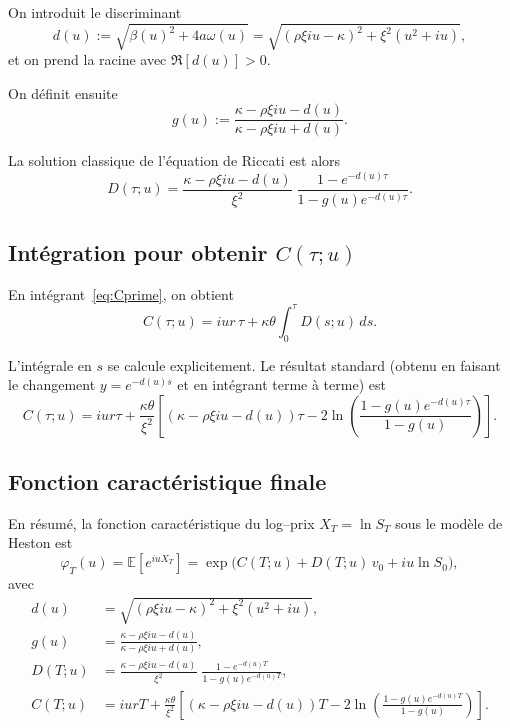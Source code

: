 \documentclass[11pt,a4paper]{article}
\newcommand{\1}{\mathbf{1}}
\begin{document}
On introduit le discriminant
\begin{equation}
d(u) := \sqrt{\beta(u)^2 + 4a\omega(u)}
      = \sqrt{(\rho\xi i u - \kappa)^2 + \xi^2(u^2+i u)},
\end{equation}
et on prend la racine avec $\Re[d(u)]>0$.

On d\'efinit ensuite
\begin{equation}
g(u) := \frac{\kappa - \rho\xi i u - d(u)}{\kappa - \rho\xi i u + d(u)}.
\end{equation}

La solution classique de l'\'equation de Riccati est alors
\begin{equation}
D(\tau;u)
= \frac{\kappa - \rho\xi i u - d(u)}{\xi^2}\;
  \frac{1 - e^{-d(u)\tau}}{1 - g(u)e^{-d(u)\tau}}.
\end{equation}

\subsection{Int\'egration pour obtenir $C(\tau;u)$}

En int\'egrant~\eqref{eq:Cprime}, on obtient
\begin{equation}
C(\tau;u) = i u r\,\tau
+ \kappa\theta\int_0^\tau D(s;u)\,ds.
\end{equation}

L'int\'egrale en $s$ se calcule explicitement. Le r\'esultat standard (obtenu
en faisant le changement $y=e^{-d(u)s}$ et en int\'egrant terme \`a terme) est
\begin{equation}
C(\tau;u)
= i u r \tau
+ \frac{\kappa\theta}{\xi^2}
  \left[
     \left(\kappa - \rho\xi i u - d(u)\right)\tau
     - 2\ln\!\left(\frac{1 - g(u)e^{-d(u)\tau}}{1 - g(u)}\right)
  \right].
\end{equation}

\subsection{Fonction caract\'eristique finale}

En r\'esum\'e, la fonction caract\'eristique du log--prix $X_T=\ln S_T$ sous
le mod\`ele de Heston est
\begin{equation}
\boxed{
\varphi_T(u)
= \mathbb{E}\!\left[ e^{i u X_T} \right]
= \exp\!\Big(
C(T;u) + D(T;u)\,v_0 + i u \ln S_0
\Big),
}
\end{equation}
avec
\begin{align}
d(u) &= \sqrt{(\rho\xi i u - \kappa)^2 + \xi^2(u^2+i u)},\\[3pt]
g(u) &= \frac{\kappa - \rho\xi i u - d(u)}{\kappa - \rho\xi i u + d(u)},\\[3pt]
D(T;u) &= \frac{\kappa - \rho\xi i u - d(u)}{\xi^2}\;
         \frac{1 - e^{-d(u)T}}{1 - g(u)e^{-d(u)T}},\\[3pt]
C(T;u) &= i u r T
+ \frac{\kappa\theta}{\xi^2}
  \left[
     \left(\kappa - \rho\xi i u - d(u)\right)T
     - 2\ln\!\left(\frac{1 - g(u)e^{-d(u)T}}{1 - g(u)}\right)
  \right].
\end{align}
\end{document}
